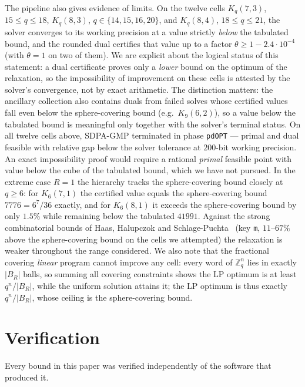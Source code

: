 \documentclass[11pt]{amsart}
\newcommand{\Kq}[3]{K_{#1}(#2,#3)}
\newcommand{\Zq}{\mathbb{Z}_q}
\begin{document}
The pipeline also gives evidence of limits. On the twelve cells
$\Kq{q}{7}{3}$, $15\le q\le 18$, $\Kq{q}{8}{3}$, $q\in\{14,15,16,20\}$,
and $\Kq{q}{8}{4}$, $18\le q\le 21$, the solver converges to its working
precision at a value strictly \emph{below} the tabulated bound, and the
rounded dual certifies that value up to a factor
$\theta\ge 1-2.4\cdot 10^{-4}$ (with $\theta=1$ on two of them). We are
explicit about the logical status of this statement: a dual certificate
proves only a \emph{lower} bound on the optimum of the relaxation, so the
impossibility of improvement on these cells is attested by the solver's
convergence, not by exact arithmetic. The distinction matters: the
ancillary collection also contains duals from failed solves whose
certified values fall even below the sphere-covering bound (e.g.\
$\Kq{9}{6}{2}$), so a value below the tabulated bound is meaningful only
together with the solver's terminal status. On all twelve cells above,
SDPA-GMP terminated in phase \texttt{pdOPT} --- primal and dual feasible
with relative gap below the solver tolerance at $200$-bit working
precision. An exact impossibility proof would
require a rational \emph{primal} feasible point with value below the cube
of the tabulated bound, which we have not pursued. In the extreme case
$R=1$ the hierarchy tracks the sphere-covering bound closely at $q\ge 6$:
for $\Kq{6}{7}{1}$ the certified value equals the sphere-covering bound
$7776=6^7/36$ exactly, and for $\Kq{6}{8}{1}$ it exceeds the
sphere-covering bound by only $1.5\%$ while remaining below the tabulated
$41991$. Against the strong combinatorial bounds of Haas, Halupczok and
Schlage-Puchta~\cite{HHSP2009} (key \texttt{m}, $11$--$67\%$ above the
sphere-covering bound on the cells we attempted) the relaxation is weaker
throughout the range considered.
We also note that the fractional covering \emph{linear} program cannot
improve any cell: every word of $\Zq^n$ lies in exactly $|B_R|$ balls, so
summing all covering constraints shows the LP optimum is at least
$q^n/|B_R|$, while the uniform solution attains it; the LP optimum is thus
exactly $q^n/|B_R|$, whose ceiling is the sphere-covering bound.

\section{Verification}\label{sec:verify}

Every bound in this paper was verified independently of the software that
produced it.
\end{document}
